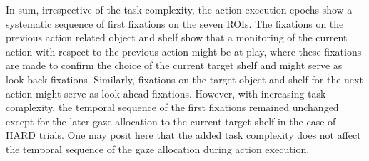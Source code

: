 In sum, irrespective of the task complexity, the action execution epochs show a systematic sequence of first fixations on the seven ROIs. The fixations on the previous action related object and shelf show that a monitoring of the current action with respect to the previous action might be at play, where these fixations are made to confirm the choice of the current target shelf and might serve as look-back fixations. Similarly, fixations on the target object and shelf for the next action might serve as look-ahead fixations. However, with increasing task complexity, the temporal sequence of the first fixations remained unchanged except for the later gaze allocation to the current target shelf in the case of HARD trials. One may posit here that the added task complexity does not affect the temporal sequence of the gaze allocation during action execution.